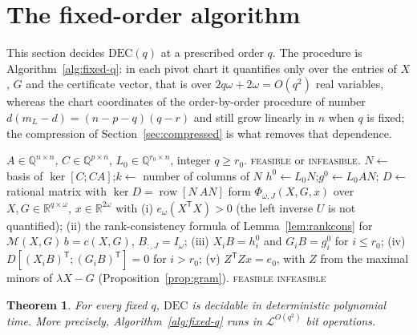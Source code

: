 \documentclass[journal]{IEEEtran}
\theoremstyle{plainn}
\newtheorem{thm}{Theorem}
\theoremstyle{remark}
\begin{document}
\section{The fixed-order algorithm}\label{sec:fixedq}

This section decides $\mathrm{DEC}(q)$ at a prescribed order $q$. The procedure
is Algorithm~\ref{alg:fixed-q}: in each pivot chart it quantifies only over the
entries of $X$, $G$ and the certificate vector, that is over
$2q\omega+2\omega=O(q^2)$ real variables, whereas the chart coordinates of the
order-by-order procedure of \cite{fer26b} number $d(m_L-d)=(n-p-q)(q-r)$ and
still grow linearly in $n$ when $q$ is fixed; the compression of
Section~\ref{sec:compressed} is what removes that dependence.

\begin{algorithm}[!t]
\caption{Deciding $\mathrm{DEC}(q)$ for a fixed order $q$}
\label{alg:fixed-q}
\begin{algorithmic}[1]
\Require $A\in\mathbb Q^{n\times n}$, $C\in\mathbb Q^{p\times n}$,
$L_0\in\mathbb Q^{r_0\times n}$, integer $q\ge r_0$.
\Ensure \textsc{feasible} or \textsc{infeasible}.
\State $N\gets$ basis of $\ker[C;CA]$;\quad $k\gets$ number of columns of $N$
\State $h^0\gets L_0N$;\quad $g^0\gets L_0AN$;\quad
$D\gets$ rational matrix with $\ker D=\operatorname{row}[N\ AN]$
    \State form $\Phi_{\omega,J}(X,G,x)$ over $X,G\in\mathbb R^{q\times\omega}$,
           $x\in\mathbb R^{2\omega}$ with
    \Statex \quad (i) $e_\omega(X^{\mathsf T}X)>0$ (the left inverse $U$ is
           not quantified);
    \Statex \quad (ii) the rank-consistency formula of
           Lemma~\ref{lem:rankcons} for $\mathcal M(X,G)\,b=c(X,G)$, $B_{:,J}=I_\omega$;
    \Statex \quad (iii) $X_iB=h_i^0$ and $G_iB=g_i^0$ for $i\le r_0$;
    \Statex \quad (iv) $D[(X_iB)^{\mathsf T};(G_iB)^{\mathsf T}]=0$ for
           $i>r_0$;
    \Statex \quad (v) $Z^{\mathsf T}Zx=e_0$, with $Z$ from the maximal minors
           of $\lambda X-G$ (Proposition~\ref{prop:gram}).
      \State \Return \textsc{feasible}
    \EndIf
  \EndFor
\EndFor
\State \Return \textsc{infeasible}
\end{algorithmic}
\end{algorithm}

\begin{thm}\label{thm:fixedq}
For every fixed $q$, $\mathrm{DEC}$ is decidable in deterministic polynomial
time. More precisely, Algorithm~\ref{alg:fixed-q} runs in
$\mathcal L^{O(q^2)}$ bit operations.
\end{thm}
\end{document}
